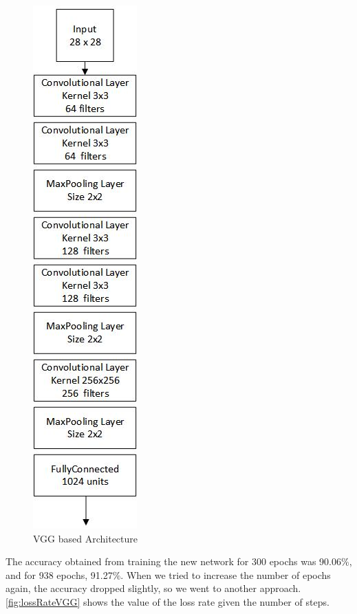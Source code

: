 \documentclass[twoside,twocolumn]{article}
\begin{document}
    \begin{figure}[h]
    \begin{center}
        \includegraphics[scale=0.65]{vggArch.jpg}
        \caption{VGG based Architecture\label{fig:vgg}}
    \end{center}
    \end{figure}
    
    The accuracy obtained from training the new network for 300 epochs was 90.06\%, and for 938 epochs, 91.27\%. When we tried to increase the number of epochs again, the accuracy dropped slightly, so we went to another approach. \ref{fig:lossRateVGG} shows the value of the loss rate given the number of steps.
    
\end{document}

